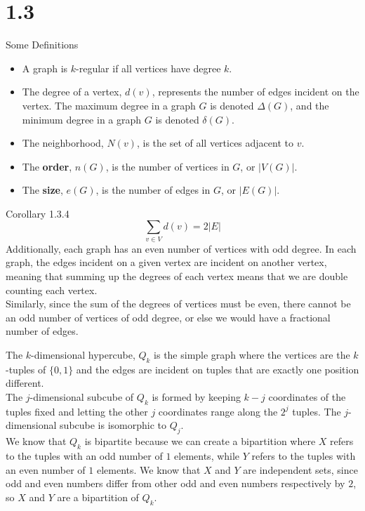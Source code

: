 \documentclass[10pt]{extarticle}
\begin{document}
\section*{1.3}%
\begin{problem}{Some Definitions}
  \begin{itemize}
    \item A graph is $k$-regular if all vertices have degree $k$.
    \item The degree of a vertex, $d(v)$, represents the number of edges incident on the vertex. The maximum degree in a graph $G$ is denoted $\Delta(G)$, and the minimum degree in a graph $G$ is denoted $\delta(G)$.
    \item The neighborhood, $N(v)$, is the set of all vertices adjacent to $v$.
    \item The \textbf{order}, $n(G)$, is the number of vertices in $G$, or $|V(G)|$.
    \item The \textbf{size}, $e(G)$, is the number of edges in $G$, or $|E(G)|$.
  \end{itemize}
  \begin{problem}{Corollary 1.3.4}
    \[
      \sum_{v\in V} d(v) = 2|E|
    \]
    Additionally, each graph has an even number of vertices with odd degree.
    \tcblower
    In each graph, the edges incident on a given vertex are incident on another vertex, meaning that summing up the degrees of each vertex means that we are double counting each vertex.\\

    Similarly, since the sum of the degrees of vertices must be even, there cannot be an odd number of vertices of odd degree, or else we would have a fractional number of edges.
  \end{problem}
  The $k$-dimensional hypercube, $Q_k$ is the simple graph where the vertices are the $k$-tuples of $\{0,1\}$ and the edges are incident on tuples that are exactly one position different.\\

  The $j$-dimensional subcube of $Q_k$ is formed by keeping $k-j$ coordinates of the tuples fixed and letting the other $j$ coordinates range along the $2^j$ tuples. The $j$-dimensional subcube is isomorphic to $Q_j$.\\

  We know that $Q_k$ is bipartite because we can create a bipartition where $X$ refers to the tuples with an odd number of $1$ elements, while $Y$ refers to the tuples with an even number of $1$ elements. We know that $X$ and $Y$ are independent sets, since odd and even numbers differ from other odd and even numbers respectively by $2$, so $X$ and $Y$ are a bipartition of $Q_k$.
\end{problem}
\end{document}
